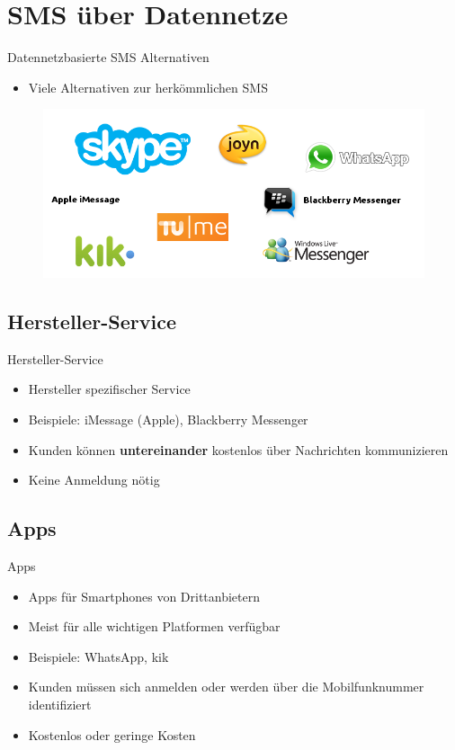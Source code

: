 \documentclass{beamer}
\begin{document}

\section{SMS über Datennetze}
\begin{frame}{Datennetzbasierte SMS Alternativen}
	\begin{itemize}
		\item Viele Alternativen zur herkömmlichen SMS
	\end{itemize}
	\begin{figure}[htm]
		\includegraphics[width=\textwidth]{img/messengers.png}
		\label{messengers}
	\end{figure}
\end{frame}

\subsection{Hersteller-Service}
\begin{frame}{Hersteller-Service}
	\begin{itemize}
		\item Hersteller spezifischer Service
		\item Beispiele: iMessage (Apple), Blackberry Messenger
		\item Kunden können \textbf{untereinander} kostenlos über Nachrichten kommunizieren
		\item Keine Anmeldung nötig
	\end{itemize}
\end{frame}

\subsection{Apps}
\begin{frame}{Apps}
	\begin{itemize}
		\item Apps für Smartphones von Drittanbietern
		\item Meist für alle wichtigen Platformen verfügbar
		\item Beispiele: WhatsApp, kik
		\item Kunden müssen sich anmelden oder werden über die Mobilfunknummer identifiziert
		\item Kostenlos oder geringe Kosten
	\end{itemize}
\end{frame}
\end{document}
